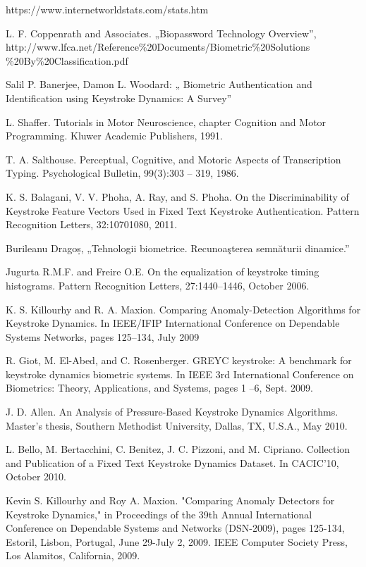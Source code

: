 \documentclass[9pt,shortpaper,twoside,web]{ieeecolor}
\begin{document}
\begin{thebibliography}{00}

 https://www.internetworldstats.com/stats.htm

 L. F. Coppenrath and Associates. „Biopassword Technology Overview”, http://www.lfca.net/Reference\%20Documents/Biometric\%20Solutions \%20By\%20Classification.pdf

 Salil P. Banerjee, Damon L. Woodard: „ Biometric Authentication and Identification using Keystroke Dynamics: A Survey”

 L. Shaffer. Tutorials in Motor Neuroscience, chapter Cognition and Motor Programming. Kluwer Academic Publishers, 1991.

 T. A. Salthouse. Perceptual, Cognitive, and Motoric Aspects of Transcription Typing. Psychological Bulletin, 99(3):303 – 319, 1986.

 K. S. Balagani, V. V. Phoha, A. Ray, and S. Phoha. On the Discriminability of Keystroke Feature Vectors Used in Fixed Text Keystroke Authentication. Pattern Recognition Letters, 32:10701080, 2011.

 Burileanu Dragoș, „Tehnologii biometrice. Recunoaşterea semnăturii dinamice.”

 Jugurta R.M.F. and Freire O.E. On the equalization of keystroke timing histograms. Pattern Recognition Letters, 27:1440–1446, October 2006.

 K. S. Killourhy and R. A. Maxion. Comparing Anomaly-Detection Algorithms for Keystroke Dynamics. In IEEE/IFIP International Conference on Dependable Systems Networks, pages 125–134, July 2009

 R. Giot, M. El-Abed, and C. Rosenberger. GREYC keystroke: A benchmark for keystroke dynamics biometric systems. In IEEE 3rd International Conference on Biometrics: Theory, Applications, and Systems, pages 1 –6, Sept. 2009.

 J. D. Allen. An Analysis of Pressure-Based Keystroke Dynamics Algorithms. Master’s thesis,
Southern Methodist University, Dallas, TX, U.S.A., May 2010.

 L. Bello, M. Bertacchini, C. Benitez, J. C. Pizzoni, and M. Cipriano. Collection and Publication of a Fixed Text Keystroke Dynamics Dataset. In CACIC’10, October 2010.

 Kevin S. Killourhy and Roy A. Maxion. "Comparing Anomaly Detectors for Keystroke Dynamics," in Proceedings of the 39th Annual International Conference on Dependable Systems and Networks (DSN-2009), pages 125-134, Estoril, Lisbon, Portugal, June 29-July 2, 2009. IEEE Computer Society Press, Los Alamitos, California, 2009.


\end{thebibliography}
\end{document}
